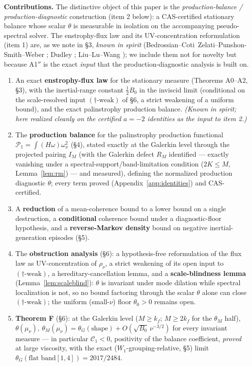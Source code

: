 \documentclass[11pt]{article}
\theoremstyle{remark}
\theoremstyle{plain}
\begin{document}
\textbf{Contributions.} The distinctive object of this paper is the
\emph{production-balance / production-diagnostic} construction (item 2 below): a
CAS-certified stationary balance whose scalar $\theta$ is measurable in isolation on the
accompanying pseudo-spectral solver. The enstrophy-flux law and its UV-concentration reformulation (item
1) are, as we note in \S3, \emph{known in spirit} (Bedrossian--Coti~Zelati--Punshon-Smith--Weber
\cite{BCZPSW2020}; Dudley \cite{Dudley2023}; Liu--Lu--Wang \cite{LiuLuWang2026}); we include
them not for novelty but because A1$''$ is the exact
\emph{input} that the production-diagnostic analysis is built on.
\begin{enumerate}
\item An exact \textbf{enstrophy-flux law} for the stationary measure (Theorems A0--A2, \S3), with
   the inertial-range constant $\tfrac12 B_0$ in the inviscid limit (conditional on the
   scale-resolved input $(\dagger\text{-weak})$ of \S6, a strict weakening of a uniform bound),
   and the exact palinstrophy production balance. \emph{(Known in spirit;
   here realized cleanly on the certified $a=-2$ identities as the input to item 2.)}
\item The \textbf{production balance} for the palinstrophy production functional
   $\mathcal{P}_1 = \int (H\omega)\omega_x^2$ (\S4), stated exactly at the Galerkin level through the
   projected pairing $I_M$ (with the Galerkin defect $R_M$ identified --- exactly vanishing under a spectral-support/band-limitation condition ($2K \le M$, Lemma~\ref{lem:rm}) --- and measured),
   defining the normalized production diagnostic $\theta$; every term proved
   (Appendix~\ref{app:identities}) and CAS-certified.
\item A \textbf{reduction} of a mean-coherence bound to a lower bound on a single
   destruction, a \textbf{conditional} coherence bound under a diagnostic-floor
   hypothesis, and a \textbf{reverse-Markov density} bound on negative inertial-generation episodes
   (\S5).
\item The \textbf{obstruction analysis} (\S6): a hypothesis-free reformulation of the
   flux law as UV-concentration of $\rho_\nu$, a strict weakening of its open input to
   $(\dagger\text{-weak})$, a hereditary-cancellation lemma, and a
   \textbf{scale-blindness lemma} (Lemma~\ref{lem:scaleblind}): $\theta$ is invariant
   under mode dilation while spectral localization is not, so no bound factoring
   through the scalar $\theta$ alone can close $(\dagger\text{-weak})$; the uniform
   (small-$\nu$) floor $\theta_0 > 0$ remains open.
\item \textbf{Theorem F} (\S6): at the Galerkin level ($M \ge k_f$; $M \ge 2k_f$ for
   the $\theta_M$ half),
   $\theta(\mu_\nu),\ \theta_M(\mu_\nu) = \theta_G(\text{shape}) + O(\sqrt{B_0}\,\nu^{-3/2})$ for every
   invariant measure --- in particular $\mathcal{C}_1 < 0$, positivity of the balance
   coefficient, \emph{proved} at
   large viscosity, with the exact ($W_1$-grouping-relative, \S5) limit $\theta_G(\text{flat band}[1,4]) = 2017/2484$.
\end{enumerate}
\end{document}
